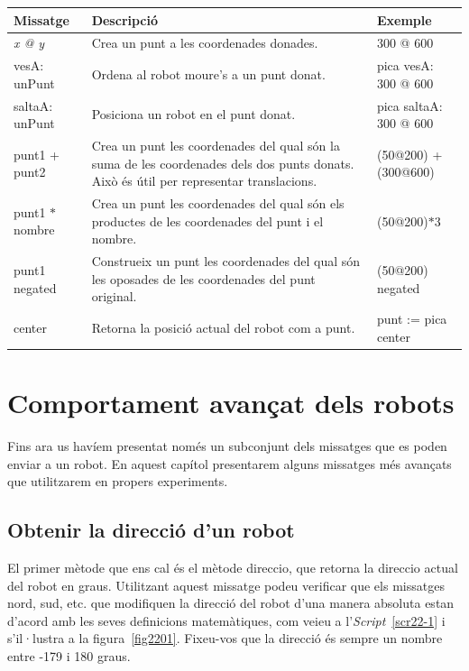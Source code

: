 \noindent
\setlength{\extrarowheight}{1mm}
{\small \begin{tabular}{p{30mm}p{60mm}p{40mm}}
\hline
\textbf{Missatge} & \textbf{Descripció} & \textbf{Exemple} \\
\hline
\textsf{{\itshape x @ y}} & Crea un punt a les coordenades donades. & \textsf{300 @ 600}\\
\textsf{vesA: unPunt} & Ordena al robot moure's a un punt donat. & \textsf{pica vesA: 300 @ 600}\\
\textsf{saltaA: unPunt} & Posiciona un robot en el punt donat. & \textsf{pica saltaA: 300 @ 600}\\
\textsf{punt1 + punt2} & Crea un punt les coordenades del qual són la suma de les coordenades dels dos punts donats. Això és útil per representar translacions.
& \textsf{(50@200) + (300@600)}\\
\textsf{punt1 $*$ nombre} & Crea un punt les coordenades del qual són els productes de les coordenades del punt i el nombre. & \textsf{(50@200)$*$3}\\
\textsf{punt1 negated} & Construeix un punt les coordenades del qual són les oposades de les coordenades del punt original. & \textsf{(50@200) negated}\\
\textsf{center} & Retorna la posició actual del robot com a punt. & \textsf{punt := pica center}\\
\hline
\end{tabular}}

\chapter{Comportament avançat dels robots}
\label{cap22}

Fins ara us havíem presentat només un subconjunt dels missatges que es poden enviar a un robot. En aquest capítol presentarem alguns missatges més avançats que utilitzarem en propers experiments.

\section{Obtenir la direcció d'un robot}
El primer mètode que ens cal és el mètode \textsf{direccio}, que retorna la direccio actual del robot en graus. Utilitzant aquest missatge podeu verificar que els missatges \textsf{nord}, \textsf{sud}, etc. que modifiquen la direcció del robot d'una manera absoluta estan d'acord amb les seves definicions matemàtiques, com veieu a l'\emph{Script}~\ref{scr22-1} i s'il·lustra a la figura~\ref{fig2201}. Fixeu-vos que la direcció és sempre un nombre entre -179 i 180 graus.

